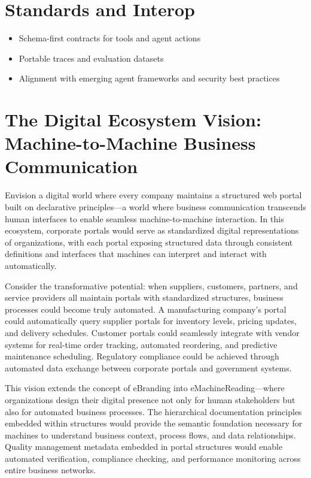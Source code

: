 \section{Standards and Interop}
\begin{itemize}
	\item Schema-first contracts for tools and agent actions
	\item Portable traces and evaluation datasets
	\item Alignment with emerging agent frameworks and security best practices
\end{itemize}

\section{The Digital Ecosystem Vision: Machine-to-Machine Business Communication}
\label{sec:digital-ecosystem-vision}

Envision a digital world where every company maintains a structured web portal built on declarative principles—a world where business communication transcends human interfaces to enable seamless machine-to-machine interaction. In this ecosystem, corporate portals would serve as standardized digital representations of organizations, with each portal exposing structured data through consistent \wbdl{} definitions and \wbpl{} interfaces that machines can interpret and interact with automatically.

Consider the transformative potential: when suppliers, customers, partners, and service providers all maintain portals with standardized structures, business processes could become truly automated. A manufacturing company's portal could automatically query supplier portals for inventory levels, pricing updates, and delivery schedules. Customer portals could seamlessly integrate with vendor systems for real-time order tracking, automated reordering, and predictive maintenance scheduling. Regulatory compliance could be achieved through automated data exchange between corporate portals and government systems.

This vision extends the concept of eBranding into eMachineReading—where organizations design their digital presence not only for human stakeholders but also for automated business processes. The hierarchical documentation principles embedded within \wbdl{} structures would provide the semantic foundation necessary for machines to understand business context, process flows, and data relationships. Quality management metadata embedded in portal structures would enable automated verification, compliance checking, and performance monitoring across entire business networks.

